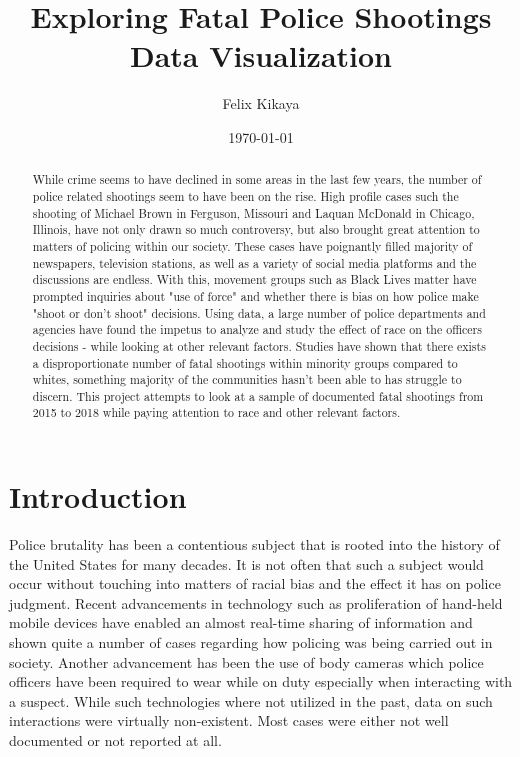 \documentclass[a4paper,12pt]{article}
\title{\textbf{Exploring Fatal Police Shootings\\
\large{Data Visualization}
}}
\author{Felix Kikaya}
\date{\today}
\begin{document}
\maketitle

\begin{abstract}
While crime seems to have declined in some areas in the last few years, the number of police related shootings seem to have been on the rise. High profile cases such the shooting of Michael Brown\cite{ferguson} in Ferguson, Missouri and Laquan McDonald in Chicago, Illinois, have not only drawn so much controversy, but also brought great attention to matters of policing within our society. These cases have poignantly filled majority of newspapers, television stations, as well as a variety of social media platforms and the discussions are endless. With this, movement groups such as Black Lives matter have prompted inquiries about "use of force" and whether there is bias on how police make "shoot or don't shoot" decisions. Using data, a large number of police departments and agencies have found the impetus to analyze and study the effect of race on the officers decisions - while looking at other relevant factors. Studies have shown that there exists a disproportionate number of fatal shootings within minority groups compared to whites, something majority of the communities hasn't been able to has struggle to discern. This project attempts to look at a sample of documented fatal shootings from 2015 to 2018 while paying attention to race and other relevant factors. 
\end{abstract}

\section{Introduction}
Police brutality has been a contentious subject that is rooted into the history of the United States for many decades. It is not often that such a subject would occur without touching into matters of racial bias and the effect it has on police judgment. Recent advancements in technology such as proliferation of hand-held mobile devices have enabled an almost real-time sharing of information and shown quite a number of cases regarding how policing was being carried out in society. Another advancement has been the use of body cameras which police officers have been required to wear while on duty especially when interacting with a suspect. While such technologies where not utilized in the past, data on such interactions were virtually non-existent. Most cases were either not well documented or not reported at all. 
 
\end{document}
